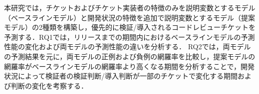 \documentclass[11pt]{jreport}
\begin{document}
本研究では，チケットおよびチケット実装者の特徴のみを説明変数とするモデル（ベースラインモデル）と開発状況の特徴を追加で説明変数とするモデル（提案モデル）の2種類を構築し，優先的に検証/導入されるコードレビューチケットを予測する．RQ1では，リリースまでの期間内におけるベースラインモデルの予測性能の変化および両モデルの予測性能の違いを分析する．
RQ2では，両モデルの予測結果を元に，両モデルの正例および負例の網羅率を比較し，提案モデルの網羅率がベースラインモデルの網羅率より高くなる期間を分析することで，開発状況によって検証者の検証判断/導入判断が一部のチケットで変化する期間および判断の変化を考察する．







\end{document}
